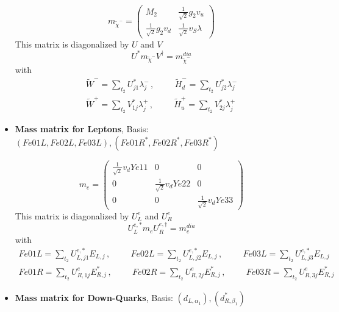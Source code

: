 \begin{itemize}
\begin{equation} 
m_{\tilde{\chi}^-} = \left( 
\begin{array}{cc}
M_2 &\frac{1}{\sqrt{2}} g_2 v_u \\ 
\frac{1}{\sqrt{2}} g_2 v_d  &\frac{1}{\sqrt{2}} v_S \lambda \end{array} 
\right) 
 \end{equation} 
This matrix is diagonalized by \(U\) and \(V\) 
\begin{equation} 
U^* m_{\tilde{\chi}^-} V^{\dagger} = m^{dia}_{\tilde{\chi}^-} 
\end{equation} 
with 
\begin{align} 
\tilde{W}^- = \sum_{t_2}U^*_{j 1}\lambda^-_{{j}}\,, \hspace{1cm} 
\tilde{H}_d^- = \sum_{t_2}U^*_{j 2}\lambda^-_{{j}}\\ 
\tilde{W}^+ = \sum_{t_2}V^*_{1 j}\lambda^+_{{j}}\,, \hspace{1cm} 
\tilde{H}_u^+ = \sum_{t_2}V^*_{2 j}\lambda^+_{{j}}
\end{align} 
\item {\bf Mass matrix for Leptons}, Basis: \( \left(Fe01L, Fe02L, Fe03L\right), \left(Fe01R^*, Fe02R^*, Fe03R^*\right) \) 
 
\begin{equation} 
m_{e} = \left( 
\begin{array}{ccc}
\frac{1}{\sqrt{2}} v_d Ye11  &0 &0\\ 
0 &\frac{1}{\sqrt{2}} v_d Ye22  &0\\ 
0 &0 &\frac{1}{\sqrt{2}} v_d Ye33 \end{array} 
\right) 
 \end{equation} 
This matrix is diagonalized by \(U^e_L\) and \(U^e_R\) 
\begin{equation} 
U^{e,*}_L m_{e} U_{R}^{e,\dagger} = m^{dia}_{e} 
\end{equation} 
with 
\begin{align} 
Fe01L = \sum_{t_2}U^{e,*}_{L,{j 1}}E_{L,{j}}\,, \hspace{1cm} 
Fe02L = \sum_{t_2}U^{e,*}_{L,{j 2}}E_{L,{j}}\,, \hspace{1cm} 
Fe03L = \sum_{t_2}U^{e,*}_{L,{j 3}}E_{L,{j}}\\ 
Fe01R = \sum_{t_2}U_{R,{1 j}}^{e}E^*_{R,{j}}\,, \hspace{1cm} 
Fe02R = \sum_{t_2}U_{R,{2 j}}^{e}E^*_{R,{j}}\,, \hspace{1cm} 
Fe03R = \sum_{t_2}U_{R,{3 j}}^{e}E^*_{R,{j}}
\end{align} 
\item {\bf Mass matrix for Down-Quarks}, Basis: \( \left(d_{L,{{\alpha_1}}}\right), \left(d^*_{R,{{\beta_1}}}\right) \) 
 

\end{itemize}
